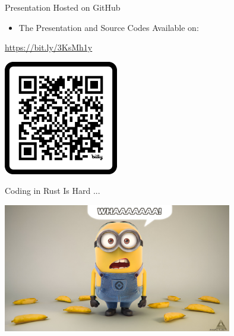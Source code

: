 \documentclass[10pt,aspectratio=169]{beamer}
\begin{document}

\begin{frame}{Presentation Hosted on GitHub}
    \begin{itemize}
        \item The Presentation and Source Codes Available on:
    \end{itemize}

    \begin{center}
        \url{https://bit.ly/3KsMh1y}    
    \end{center}    

    \begin{center}
        \includegraphics[width=0.375\textwidth]{img/qr.pdf}
    \end{center}
\end{frame}

\begin{frame}{Coding in Rust Is Hard ...}
    \begin{center}
        \includegraphics[width=0.75\textwidth]{img/minion.jpeg}
    \end{center}
\end{frame}
\end{document}

